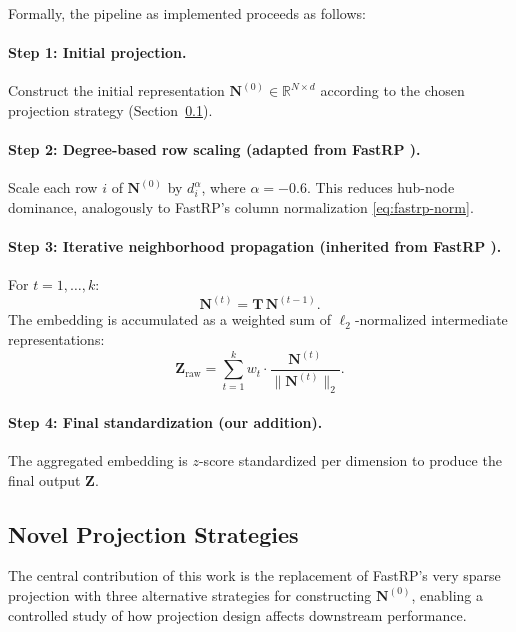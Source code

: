 \documentclass[conference]{IEEEtran}
\begin{document}
Formally, the pipeline as implemented proceeds as follows:

\paragraph{Step 1: Initial projection.}
Construct the initial representation $\mathbf{N}^{(0)} \in \mathbb{R}^{N \times d}$
according to the chosen projection strategy (Section~\ref{subsec:strategies}).

\paragraph{Step 2: Degree-based row scaling (adapted from FastRP \cite{chen2019fast}).}
Scale each row $i$ of $\mathbf{N}^{(0)}$ by $d_i^{\alpha}$, where $\alpha = -0.6$.
This reduces hub-node dominance, analogously to FastRP's column normalization
\eqref{eq:fastrp-norm}.

\paragraph{Step 3: Iterative neighborhood propagation (inherited from FastRP \cite{chen2019fast}).}
For $t = 1, \ldots, k$:
\begin{equation}
    \mathbf{N}^{(t)} = \mathbf{T}\, \mathbf{N}^{(t-1)}.
    \label{eq:propagation}
\end{equation}
The embedding is accumulated as a weighted sum of $\ell_2$-normalized
intermediate representations:
\begin{equation}
    \mathbf{Z}_\text{raw} = \sum_{t=1}^{k} w_t \cdot
        \frac{\mathbf{N}^{(t)}}{\|\mathbf{N}^{(t)}\|_2}.
    \label{eq:weighted-sum}
\end{equation}

\paragraph{Step 4: Final standardization (our addition).}
The aggregated embedding is $z$-score standardized per dimension to produce
the final output $\mathbf{Z}$.

\subsection{Novel Projection Strategies}
\label{subsec:strategies}

The central contribution of this work is the replacement of FastRP's
very sparse projection \cite{li2006very,chen2019fast} with three
alternative strategies for constructing $\mathbf{N}^{(0)}$, enabling a
controlled study of how projection design affects downstream performance.
\end{document}
